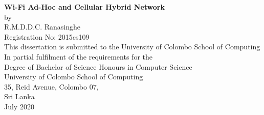 \begin{titlepage}
    \begin{center}
        {\LARGE \bfseries Wi-Fi Ad-Hoc and Cellular Hybrid Network}\\[2.5cm]
        {\Large by}\\[2.5cm]
        {\Large R.M.D.D.C. Ranasinghe}\\[0.5cm]
        {\Large Registration No: 2015cs109}
        \\
        \vfill
        This dissertation is submitted to the University of Colombo School of Computing 
        \\
        In partial fulfilment of the requirements for the
        \\
        Degree of Bachelor of Science Honours in Computer Science
        \\
        \vfill
        University of Colombo School of Computing
        \\
        35, Reid Avenue, Colombo 07,
        \\
        Sri Lanka
        \\
        July 2020

    \end{center}
\end{titlepage}
